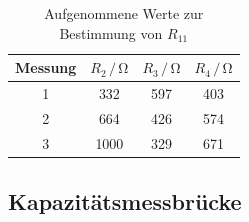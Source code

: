\begin{table}
\normalsize

\centering
{}
\begin{tabular}{c c c c}
\toprule
        Messung & $R_{2} \,/\,\si{\ohm}$ & $R_{3} \,/\,\si{\ohm}$ & $R_{4} \,/\,\si{\ohm}$ \\
        \midrule
        1 & 332 & 597 & 403  \\
        2 & 664 & 426 & 574  \\
        3 & 1000 & 329 & 671 \\ 

\bottomrule

\end{tabular}

\caption{Aufgenommene Werte zur Bestimmung von $R_{11}$}
\label{tab:1}
\end{table}







\subsection{Kapazitätsmessbrücke}
\label{Kapazitätsmessbrücke}

